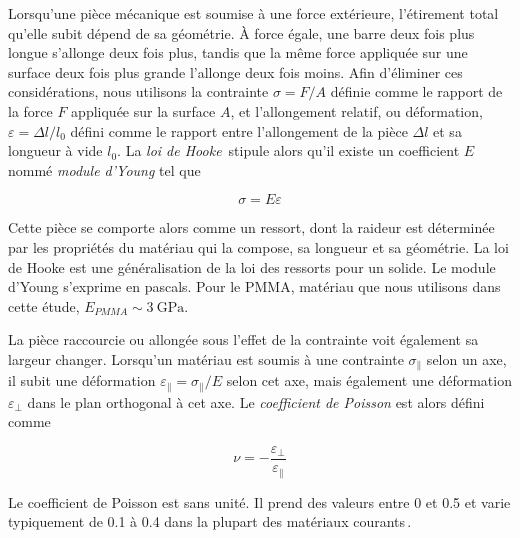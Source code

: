 Lorsqu'une pièce mécanique est soumise à une force extérieure, l'étirement total qu'elle subit dépend de sa géométrie. À force égale, une barre deux fois plus longue s'allonge deux fois plus, tandis que la même force appliquée sur une surface deux fois plus grande l'allonge deux fois moins. Afin d'éliminer ces considérations, nous utilisons la contrainte $\sigma=F/A$ définie comme le rapport de la force $F$ appliquée sur la surface $A$, et l'allongement relatif, ou déformation, $\varepsilon=\Delta l/l_0$ défini comme le rapport entre l'allongement de la pièce $\Delta l$ et sa longueur à vide $l_0$. La \textit{loi de Hooke}\,\cite{hooke_potentia_1674} stipule alors qu'il existe un coefficient $E$ nommé \textit{module d'Young} tel que

\begin{equation}
\sigma=E\varepsilon
\end{equation}

Cette pièce se comporte alors comme un ressort, dont la raideur est déterminée par les propriétés du matériau qui la compose, sa longueur et sa géométrie. La loi de Hooke est une généralisation de la loi des ressorts pour un solide. Le module d'Young s'exprime en pascals. Pour le PMMA, matériau que nous utilisons dans cette étude, $E_{PMMA}\sim\SI{3}{\giga\pascal}$.


La pièce raccourcie ou allongée sous l'effet de la contrainte voit également sa largeur changer. Lorsqu'un matériau est soumis à une contrainte $\sigma_\parallel$ selon un axe, il subit une déformation $\varepsilon_{\parallel} =\sigma_{\parallel} /E$ selon cet axe, mais également une déformation $\varepsilon_\perp$ dans le plan orthogonal à cet axe. Le \textit{coefficient de Poisson} est alors défini comme


\begin{equation}
\nu = -\frac{\varepsilon_\perp}{\varepsilon_{\parallel} }
\end{equation}


Le coefficient de Poisson est sans unité. Il prend des valeurs entre 0 et 0.5 et varie typiquement de 0.1 à 0.4 dans la plupart des matériaux courants\,\cite{feynman_feynman_1963}.

